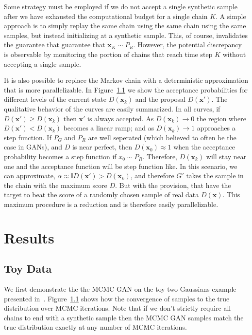 \documentclass{article}
\renewcommand{\vec}[1]{{\boldsymbol{\mathbf{#1}}}} %
\newcommand{\I}{\mathbb{I}}
\newcommand{\sample}{\sim}
\begin{document}
Some strategy must be employed if we do not accept a single synthetic sample after we have exhausted the computational budget for a single chain $K$.
A simple approach is to simply replay the same chain using the same chain using the same samples, but instead initializing at a synthetic sample.
This, of course, invalidates the guarantee that guarantee that $\vec x_K \sample P_R$.
However, the potential discrepancy is observable by monitoring the portion of chains that reach time step $K$ without accepting a single sample.


It is also possible to replace the Markov chain with a deterministic approximation that is more parallelizable.
In Figure~\ref{} we show the acceptance probabilities for different levels of the current state $D(\vec x_k)$ and the proposal $D(\vec x')$.
The qualitative behavior of the curves are easily summarized.
In all curves, if $D(\vec x') \geq D(\vec x_k)$ then $\vec x'$ is always accepted.
As $D(\vec x_k) \rightarrow 0$ the region where $D(\vec x') < D(\vec x_k)$ becomes a linear ramp; and as $D(\vec x_k) \rightarrow 1$ approaches a step function.
If $P_G$ and $P_R$ are well seperated (which believed to often be the case in GANs), and $D$ is near perfect, then $D(\vec x_0) \approx 1$ when the acceptance probability becomes a step function if $x_0 \sample P_R$.
Therefore, $D(\vec x_k)$ will stay near one and the acceptance function will be step function like.
In this scenario, we can approximate, $\alpha \approx \I{D(\vec x') > D(\vec x_k)}$, and therefore $G'$ takes the sample in the chain with the maximum score $D$.
But with the provision, that have the target to beat the score of a randomly chosen sample of real data $D(\vec x)$.
This maximum procedure is a reduction and is therefore easily parallelizable.


\section{Results}


\subsection{Toy Data}
We first demonstrate the the MCMC GAN on the toy two Gaussians example presented in~\citet{}.
Figure~\ref{} shows how the convergence of samples to the true distribution over MCMC iterations.
Note that if we don't strictly require all chains to end with a synthetic sample then the MCMC GAN samples match the true distribution exactly at any number of MCMC iterations.
\end{document}
